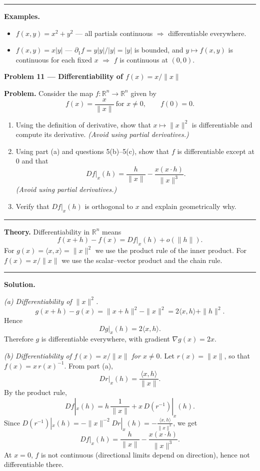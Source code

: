 \documentclass[12pt,a4paper]{article}
\theoremstyle{plain}
\theoremstyle{definition}
\theoremstyle{remark}
\theoremstyle{remark}
\newcommand{\probheader}[1]{%
	\par\vspace{8pt}%
	{\Large\bfseries #1\par}%
	\vspace{6pt}%
}
\newcommand{\sep}{\vspace{6pt}\hrule\vspace{8pt}}
\begin{document}
	\sep
	
	\textbf{Examples.}
	\begin{itemize}
		\item $f(x,y)=x^2+y^2$ — all partials continuous $\Rightarrow$ differentiable everywhere.
		\item $f(x,y)=x|y|$ — $\partial_1 f=y|y|/|y|=|y|$ is bounded, and $y\mapsto f(x,y)$
		is continuous for each fixed $x$ $\Rightarrow$ $f$ is continuous at $(0,0)$.
	\end{itemize}
	
	\probheader{Problem 11 — Differentiability of $f(x)=x/\|x\|$}
	
	\textbf{Problem.}
	Consider the map $f:\mathbb{R}^n\to\mathbb{R}^n$ given by
	\[
	f(x)=\frac{x}{\|x\|}\ \text{for }x\ne0,\qquad f(0)=0.
	\]
	\begin{enumerate}[label=(\alph*), leftmargin=1.2cm]
		\item Using the definition of derivative, show that $x\mapsto\|x\|^2$ is differentiable and compute its derivative. 
		\textit{(Avoid using partial derivatives.)}
		\item Using part (a) and questions 5(b)--5(c), show that $f$ is differentiable except at $0$ and that
		\[
		Df|_x(h)=\frac{h}{\|x\|}-\frac{x(x\!\cdot\!h)}{\|x\|^3}.
		\]
		\textit{(Avoid using partial derivatives.)}
		\item Verify that $Df|_x(h)$ is orthogonal to $x$ and explain geometrically why.
	\end{enumerate}
	
	\sep
	
	\textbf{Theory.}
	Differentiability in $\mathbb{R}^n$ means
	\[
	f(x+h)-f(x)=Df|_x(h)+o(\|h\|).
	\]
	For $g(x)=\langle x,x\rangle=\|x\|^2$ we use the product rule of the inner product.
	For $f(x)=x/\|x\|$ we use the scalar–vector product and the chain rule.
	
	\sep
	
	\textbf{Solution.}
	
	\textit{(a) Differentiability of $\|x\|^2$.}
	\[
	g(x+h)-g(x)=\|x+h\|^2-\|x\|^2=2\langle x,h\rangle+\|h\|^2.
	\]
	Hence
	\[
	Dg|_x(h)=2\langle x,h\rangle.
	\]
	Therefore $g$ is differentiable everywhere, with gradient $\nabla g(x)=2x$.
	
	\medskip
	
	\textit{(b) Differentiability of $f(x)=x/\|x\|$ for $x\ne0$.}
	Let $r(x)=\|x\|$, so that $f(x)=x\,r(x)^{-1}$.
	From part (a),
	\[
	Dr|_x(h)=\frac{\langle x,h\rangle}{\|x\|}.
	\]
	By the product rule,
	\[
	Df|_x(h)
	=h\,\frac{1}{\|x\|}
	+x\,D(r^{-1})|_x(h).
	\]
	Since $D(r^{-1})|_x(h)
	=-\|x\|^{-2}Dr|_x(h)
	=-\frac{\langle x,h\rangle}{\|x\|^3}$,
	we get
	\[
	Df|_x(h)=\frac{h}{\|x\|}-\frac{x(x\!\cdot\!h)}{\|x\|^3}.
	\]
	At $x=0$, $f$ is not continuous (directional limits depend on direction), hence not differentiable there.
	
\end{document}
